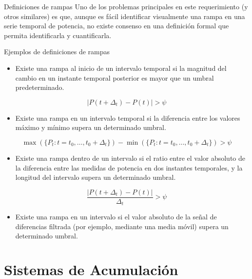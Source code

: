 \documentclass[aspectratio=169, usenames,svgnames,dvipsnames]{beamer}
\begin{document}
\begin{frame}[label={sec:org223a1a1}]{Definiciones de rampas}
Uno de los problemas principales en este requerimiento (y otros similares) es que, aunque \alert{es fácil identificar visualmente una rampa} en una serie temporal de potencia, \alert{no existe consenso en una definición formal} que permita identificarla y cuantificarla.
\end{frame}

\begin{frame}[label={sec:org4ce92b5}]{Ejemplos de definiciones de rampas}
\begin{itemize}
\item Existe una rampa al inicio de un intervalo temporal si la magnitud del cambio en un instante temporal posterior es mayor que un umbral predeterminado.
\end{itemize}
\[ 
\left| P(t +\Delta_t) - P(t)\right| > \psi
\]

\begin{itemize}
\item Existe una rampa en un intervalo temporal si la diferencia entre los
valores máximo y mínimo supera un determinado umbral.
\end{itemize}
\[
\max(\{P_t: t = t_0, \dots, t_0+\Delta_t\}) - \min(\{P_t: t=t_0,
\dots, t_0+\Delta_t\}) > \psi
\]

\begin{itemize}
\item Existe una rampa dentro de un intervalo si el ratio entre el valor absoluto de la diferencia entre las medidas de potencia en dos instantes temporales, y la longitud del intervalo supera un determinado umbral.
\end{itemize}
\[
\frac{\left|P(t + \Delta_t) - P(t)\right|}{\Delta_t} > \psi
\]

\begin{itemize}
\item Existe una rampa en un intervalo si el valor absoluto de la señal de diferencias filtrada (por ejemplo, mediante una media móvil) supera un determinado umbral.
\end{itemize}
\end{frame}

\section{Sistemas de Acumulación}
\label{sec:org3d89284}
\end{document}
